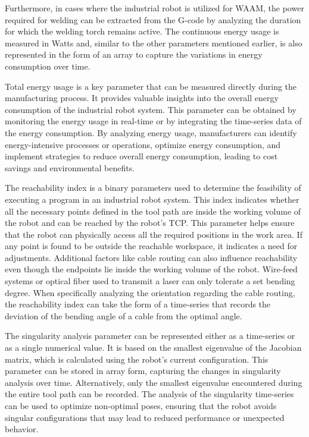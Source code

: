 Furthermore, in cases where the industrial robot is utilized for WAAM, the power required for welding can be extracted from the G-code by analyzing the duration for which the welding torch remains active. The continuous energy usage is measured in Watts and, similar to the other parameters mentioned earlier, is also represented in the form of an array to capture the variations in energy consumption over time.

Total energy usage is a key parameter that can be measured directly during the manufacturing process. It provides valuable insights into the overall energy consumption of the industrial robot system. This parameter can be obtained by monitoring the energy usage in real-time or by integrating the time-series data of the energy consumption. By analyzing energy usage, manufacturers can identify energy-intensive processes or operations, optimize energy consumption, and implement strategies to reduce overall energy consumption, leading to cost savings and environmental benefits.



The reachability index is a binary parameters used to determine the feasibility of executing a program in an industrial robot system. This index indicates whether all the necessary points defined in the tool path are inside the working volume of the robot and can be reached by the robot's TCP. This parameter helps ensure that the robot can physically access all the required positions in the work area. If any point is found to be outside the reachable workspace, it indicates a need for adjustments. Additional factors like cable routing can also influence reachability even though the endpoints lie inside the working volume of the robot. Wire-feed systems or optical fiber used to transmit a laser can only tolerate a set bending degree. When specifically analyzing the orientation regarding the cable routing, the reachability index can take the form of a time-series that records the deviation of the bending angle of a cable from the optimal angle.


The singularity analysis parameter can be represented either as a time-series or as a single numerical value. It is based on the smallest eigenvalue of the Jacobian matrix, which is calculated using the robot's current configuration. This parameter can be stored in array form, capturing the changes in singularity analysis over time. Alternatively, only the smallest eigenvalue encountered during the entire tool path can be recorded. The analysis of the singularity time-series can be used to optimize non-optimal poses, ensuring that the robot avoids singular configurations that may lead to reduced performance or unexpected behavior.

